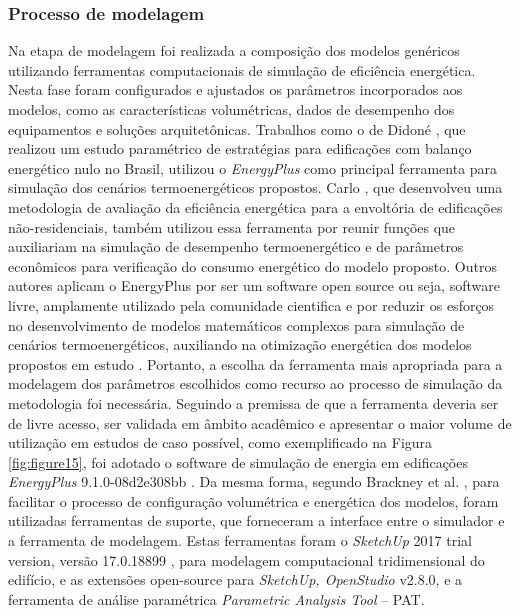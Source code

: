 \subsubsection{Processo de modelagem}
\noindent Na etapa de modelagem foi realizada a composição dos modelos genéricos utilizando ferramentas computacionais de simulação de eficiência energética. Nesta fase foram configurados e ajustados os parâmetros incorporados aos modelos, como as características volumétricas, dados de desempenho dos equipamentos e soluções arquitetônicas.\vspace*{0.3cm} \newline
\noindent Trabalhos como o de Didoné \citeyear{Didone2014}, que realizou um estudo paramétrico de estratégias para edificações com balanço energético nulo no Brasil, utilizou o \textit{EnergyPlus} como principal ferramenta para simulação dos cenários termoenergéticos propostos. Carlo \citeyear{Carlo2008}, que desenvolveu uma metodologia de avaliação da eficiência energética para a envoltória de edificações não-residenciais, também utilizou essa ferramenta por reunir funções que auxiliariam na simulação de desempenho termoenergético e de parâmetros econômicos para verificação do consumo energético do modelo proposto.\vspace*{0.3cm} \newline
\noindent Outros autores aplicam o EnergyPlus por ser um software open source ou seja, software livre, amplamente utilizado pela comunidade cientifica e por reduzir os esforços no desenvolvimento de modelos matemáticos complexos para simulação de cenários termoenergéticos, auxiliando na otimização energética dos modelos propostos em estudo \cite{Vuong2015,Dahanayake2017,Shen2018,Kamal2019}.\vspace*{0.3cm} \newline
\noindent Portanto, a escolha da ferramenta mais apropriada para a modelagem dos parâmetros escolhidos como recurso ao processo de simulação da metodologia foi necessária. Seguindo a premissa de que a ferramenta deveria ser de livre acesso, ser validada em âmbito acadêmico e apresentar o maior volume de utilização em estudos de caso possível, como exemplificado na Figura \ref{fig:figure15}, foi adotado o software de simulação de energia em edificações \textit{EnergyPlus} 9.1.0-08d2e308bb \cite{U.S.DepartmentofEnergy-USDOE2011,Athienitis2015}.\vspace*{0.3cm} \newline
\noindent Da mesma forma, segundo Brackney et al. \citeyear{Brackney2018}, para facilitar o processo de configuração volumétrica e energética dos modelos, foram utilizadas ferramentas de suporte, que forneceram a interface entre o simulador e a ferramenta de modelagem. Estas ferramentas foram o \textit{SketchUp} 2017 trial version, versão 17.0.18899 \cite{TrimbleInc.2019}, para modelagem computacional tridimensional do edifício, e as extensões open-source para \textit{SketchUp, OpenStudio} v2.8.0, e a ferramenta de análise paramétrica \textit{Parametric Analysis Tool} – PAT.\vspace*{0.3cm} \newline
